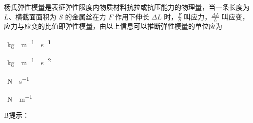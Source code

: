 杨氏弹性模量是表征弹性限度内物质材料抗拉或抗压能力的物理量，当一条长度为 $L$、横截面面积为 $S$ 的金属丝在力 $F$ 作用下伸长 $\Delta L$ 时，$\frac{F}{S}$ 叫应力，$\frac{\Delta L}{L}$ 叫应变，应力与应变的比值即弹性模量，由以上信息可以推断弹性模量的单位应为\paren[]
\begin{choices}
	\item \qty{}{kg\cdot m^{-1}\cdot s^{-1}}
	\item \qty{}{kg\cdot m^{-1}\cdot s^{-2}}
	\item \qty{}{N\cdot s^{-1}}
	\item \qty{}{N\cdot m^{-1}}
\end{choices}
\begin{answer}
    B\qquad 提示：
\end{answer}